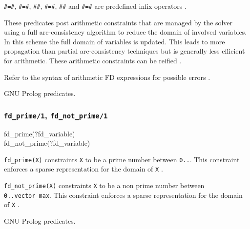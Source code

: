 \texttt{\#=\#}, \texttt{\#{\bs}=\#}, \texttt{\#{\lt}\#},
\texttt{\#={\lt}\#}, \texttt{\#{\gt}\#} and \texttt{\#{\gt}=\#} are
predefined infix operators .

These predicates post arithmetic constraints that are managed by the solver
using a full arc-consistency algorithm to reduce the domain of involved
variables. In this scheme the full domain of variables is updated. This
leads to more propagation than partial arc-consistency techniques  but is generally less efficient for arithmetic.
These arithmetic constraints can be reified .

\Errors

Refer to the syntax of arithmetic FD expressions for possible errors
.

\Portability

GNU Prolog predicates.

\subsubsection{\texttt{fd\_prime/1},
               \texttt{fd\_not\_prime/1}}

\begin{TemplatesOneCol}
fd\_prime(?fd\_variable)\\
fd\_not\_prime(?fd\_variable)

\end{TemplatesOneCol}

\Description

\texttt{fd\_prime(X)} constraints \texttt{X} to be a prime number between
\texttt{0..}.
This constraint enforces a sparse representation
for the domain of \texttt{X} .

\texttt{fd\_not\_prime(X)} constraints \texttt{X} to be a non prime number
between \texttt{0..vector\_max}. This constraint enforces a sparse
representation for the domain of \texttt{X} .

\begin{PlErrors}


\end{PlErrors}

\Portability

GNU Prolog predicates.


